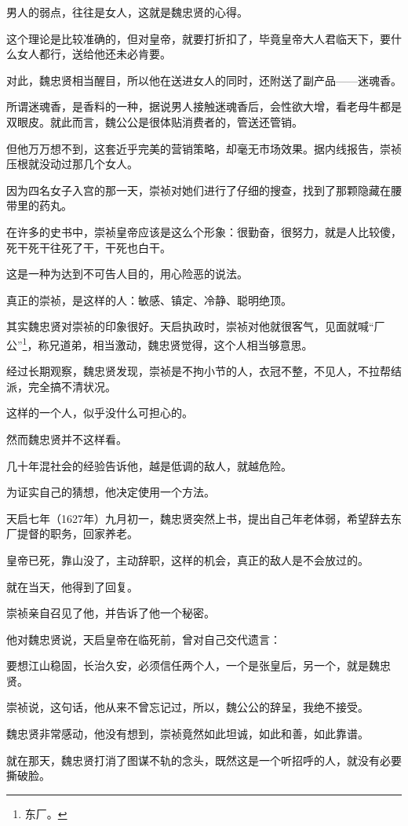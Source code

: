 \begin{multicols}{\theparacolNo}
男人的弱点，往往是女人，这就是魏忠贤的心得。

这个理论是比较准确的，但对皇帝，就要打折扣了，毕竟皇帝大人君临天下，要什么女人都行，送给他还未必肯要。

对此，魏忠贤相当醒目，所以他在送进女人的同时，还附送了副产品——迷魂香。

所谓迷魂香，是香料的一种，据说男人接触迷魂香后，会性欲大增，看老母牛都是双眼皮。就此而言，魏公公是很体贴消费者的，管送还管销。

但他万万想不到，这套近乎完美的营销策略，却毫无市场效果。据内线报告，崇祯压根就没动过那几个女人。

因为四名女子入宫的那一天，崇祯对她们进行了仔细的搜查，找到了那颗隐藏在腰带里的药丸。

在许多的史书中，崇祯皇帝应该是这么个形象：很勤奋，很努力，就是人比较傻，死干死干往死了干，干死也白干。

这是一种为达到不可告人目的，用心险恶的说法。

真正的崇祯，是这样的人：敏感、镇定、冷静、聪明绝顶。

其实魏忠贤对崇祯的印象很好。天启执政时，崇祯对他就很客气，见面就喊“厂公”\footnote{东厂。}，称兄道弟，相当激动，魏忠贤觉得，这个人相当够意思。

经过长期观察，魏忠贤发现，崇祯是不拘小节的人，衣冠不整，不见人，不拉帮结派，完全搞不清状况。

这样的一个人，似乎没什么可担心的。

然而魏忠贤并不这样看。

几十年混社会的经验告诉他，越是低调的敌人，就越危险。

为证实自己的猜想，他决定使用一个方法。

天启七年（1627年）九月初一，魏忠贤突然上书，提出自己年老体弱，希望辞去东厂提督的职务，回家养老。

皇帝已死，靠山没了，主动辞职，这样的机会，真正的敌人是不会放过的。

就在当天，他得到了回复。

崇祯亲自召见了他，并告诉了他一个秘密。

他对魏忠贤说，天启皇帝在临死前，曾对自己交代遗言：

要想江山稳固，长治久安，必须信任两个人，一个是张皇后，另一个，就是魏忠贤。

崇祯说，这句话，他从来不曾忘记过，所以，魏公公的辞呈，我绝不接受。

魏忠贤非常感动，他没有想到，崇祯竟然如此坦诚，如此和善，如此靠谱。

就在那天，魏忠贤打消了图谋不轨的念头，既然这是一个听招呼的人，就没有必要撕破脸。


\end{multicols}
